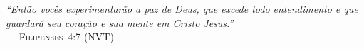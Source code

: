 {\sffamily\itshape
``Então vocês experimentarão a paz de Deus, que excede todo entendimento e que guardará seu coração e sua mente em Cristo Jesus.''\\}
--- \textsc{Filipenses~4:7} (\textsc{NVT})
